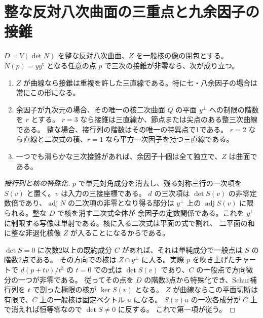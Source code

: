 \section{整な反対八次曲面の三重点と九余因子の接錐}
\label{sec:cofactor-tangent-nets}
\begin{theorem}\label{thm:cofactor-tangent-nets}
$D=V(\det N)$ を整な反対八次曲面、$Z$ を一般核の像の閉包とする。
$N(p)=yy^{\mathsf t}$ となる任意の点 $p$ で三次の接錐が非零なら、次が成り立つ。
\begin{enumerate}
\item $Z$ が曲線なら接錐は重複を許した三直線である。特に七・八余因子の場合は常にこの形になる。
\item 余因子が九次元の場合、その唯一の核二次曲面 $Q$ の平面 $y^\perp$ への制限の階数を $r$ とする。
$r=3$ なら接錐は三直線か、節点または尖点のある整三次曲線である。
整な場合、接行列の階数はその唯一の特異点で1である。
$r=2$ なら直線と二次式の積、$r=1$ なら平方一次因子を持つ三直線である。
\item 一つでも滑らかな三次接錐があれば、余因子十個は全て独立で、$Z$ は曲面である。
\end{enumerate}
\end{theorem}
\begin{proof}[接行列と核の特殊化]
$p$ で単元対角成分を消去し、残る対称三行の一次項を $S(v)$ と置く。$v$ は入力の三接座標である。
$d$ の三次項は $\det S(v)$ の非零定数倍であり、$\operatorname{adj}N$ の二次項の非零となり得る部分は
$y^\perp$ 上の $\operatorname{adj}S(v)$ に限られる。整な $D$ で核を消す二次式全体が
余因子の定数関係である。これを $y^\perp$ に制限する写像は単射である。核に入る二次式は平面の式で割れ、
二平面の和に整な非退化核像 $Z$ が入ることになるからである。

$\det S=0$ に次数2以上の既約成分 $C$ があれば、それは単純成分で一般点は $S$ の階数2点である。
その方向での核は $Z\cap y^\perp$ に入る。実際 $p$ を吹き上げたチャートで
$d(p+tv)/t^3$ の $t=0$ での式は $\det S(v)$ であり、$C$ の一般点で方向微分の一つが非零である。
従ってその点を $D$ の階数3点から特殊化でき、Schur補行列を $t$ で割った極限の核が $\ker S(v)$ となる。
$Z$ が曲線ならこの平面切断は有限で、$C$ 上の一般核は固定ベクトル $u$ になる。
$S(v)u$ の一次各成分が $C$ 上で消えれば恒等零なので $\det S\ne0$ に反する。
これで第一項が従う。
\end{proof}

